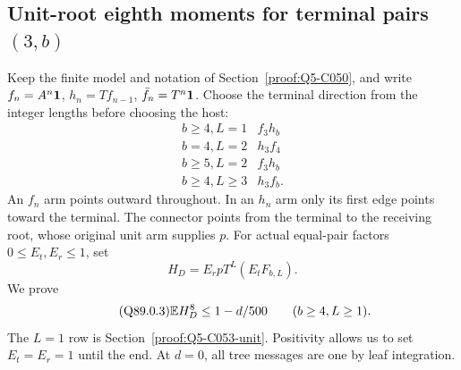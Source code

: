\subsection{Unit-root eighth moments for terminal pairs \((3,b)\)}
\label{proof:Q5-C089}
Keep the finite model and notation of Section~\ref{proof:Q5-C050}, and
write \(f_n=A^n\mathbf1\), \(h_n=Tf_{n-1}\),
\(\bar f_n=T^n\mathbf1\). Choose the terminal direction from the integer
lengths before choosing the host:
\begin{equation}\label{eq:unit-ordinary:three-directions}
\begin{array}{c|c}
 b\ge4, L=1&f_3h_b\\
 b=4, L=2&h_3f_4\\
 b\ge5, L=2&f_3h_b\\
 b\ge4, L\ge3&h_3f_b.
\end{array}
\end{equation}
An \(f_n\) arm points outward throughout. In an \(h_n\) arm only
its first edge points toward the terminal. The connector points from
the terminal to the receiving root, whose original unit arm supplies
\(p\). For actual equal-pair factors \(0\le E_t,E_r\le1\), set
\begin{equation}\tag{Q89.0.2}\label{eq:Q89:0.2}
 H_D=E_rpT^L(E_tF_{b,L}).
\end{equation}
We prove
\begin{equation}\tag{Q89.0.3}\label{eq:Q89:0.3}
 \mathbb E H_D^8\le1-d/500\qquad(b\ge4, L\ge1).
\end{equation}
The \(L=1\) row is Section~\ref{proof:Q5-C053-unit}. Positivity
allows us to set \(E_t=E_r=1\) until the end. At \(d=0\), all
tree messages are one by leaf integration.

